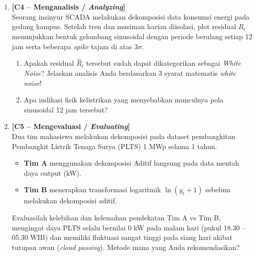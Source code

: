 \documentclass[11pt,a4paper]{article}
\begin{document}
\begin{enumerate}[leftmargin=1.8em, label=\textbf{Soal \arabic*.}]
    \item \textbf{[C4 -- Menganalisis / \textit{Analyzing}]} \\
    Seorang insinyur SCADA melakukan dekomposisi data konsumsi energi pada gedung kampus. Setelah tren dan musiman harian diisolasi, plot residual $\hat{R}_t$ menunjukkan bentuk gelombang sinusoidal dengan periode berulang setiap 12 jam serta beberapa \textit{spike} tajam di atas $3\sigma$.
    \begin{enumerate}[label=\alph*.]
        \item Apakah residual $\hat{R}_t$ tersebut sudah dapat dikategorikan sebagai \textit{White Noise}? Jelaskan analisis Anda berdasarkan 3 syarat matematis \textit{white noise}!
        \item Apa indikasi fisik kelistrikan yang menyebabkan munculnya pola sinusoidal 12 jam tersebut?
    \end{enumerate}
    \vspace{3.5cm}

    \item \textbf{[C5 -- Mengevaluasi / \textit{Evaluating}]} \\
    Dua tim mahasiswa melakukan dekomposisi pada dataset pembangkitan Pembangkit Listrik Tenaga Surya (PLTS) 1 MWp selama 1 tahun.
    \begin{itemize}
        \item \textbf{Tim A} menggunakan dekomposisi Aditif langsung pada data mentah daya output (kW).
        \item \textbf{Tim B} menerapkan transformasi logaritmik $\ln(y_t + 1)$ sebelum melakukan dekomposisi aditif.
    \end{itemize}
    Evaluasilah kelebihan dan kelemahan pendekatan Tim A vs Tim B, mengingat daya PLTS selalu bernilai 0 kW pada malam hari (pukul 18.30 -- 05.30 WIB) dan memiliki fluktuasi sangat tinggi pada siang hari akibat tutupan awan (\textit{cloud passing}). Metode mana yang Anda rekomendasikan?
    \vspace{3.5cm}


\end{enumerate}
\end{document}
